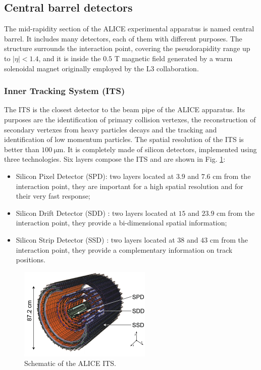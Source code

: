 \subsection{Central barrel detectors}
The mid-rapidity section of the ALICE experimental apparatus is named central barrel.
It includes many detectors, each of them with different purposes.
The structure surrounds the interaction point, covering the pseudorapidity range up to $|\eta| < 1.4$, and it is inside the $0.5$ T magnetic field generated by a warm solenoidal magnet originally employed by the L3 collaboration.

\subsubsection{Inner Tracking System (ITS)}
The ITS is the closest detector to the beam pipe of the ALICE apparatus.
Its purposes are the identification of primary collision vertexes, the reconstruction of secondary vertexes from heavy particles decays and the tracking and identification of low momentum particles.
The spatial resolution of the ITS is better than $100\ \mathrm{\mu m}$.
It is completely made of silicon detectors, implemented using three technologies.
Six layers compose the ITS and are shown in Fig. \ref{fig:ITS}:
\begin{itemize}
    \item Silicon Pixel Detector (SPD): two layers located at $3.9$ and $7.6$ cm from the interaction point, they are important for a high spatial resolution and for their very fast response;
    \item Silicon Drift Detector (SDD) : two layers located at $15$ and $23.9$ cm from the interaction point, they provide a bi-dimensional spatial information;
    \item Silicon Strip Detector (SSD) : two layers located at $38$ and $43$ cm from the interaction point, they provide a complementary information on track positions.
\end{itemize}


\begin{figure}[!h]
\begin{center}
\includegraphics[width=0.7\linewidth]{Chapters/Introduction/Figs/its.pdf}
\caption{Schematic of the ALICE ITS.}
\label{fig:ITS}
\end{center}
\end{figure}

